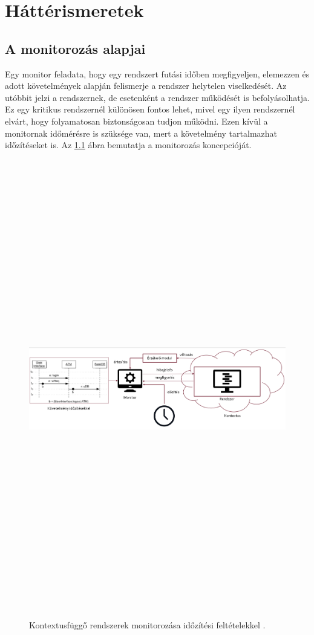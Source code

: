 \chapter{Háttérismeretek}\section{A monitorozás alapjai}

Egy monitor feladata, hogy egy rendszert futási időben megfigyeljen, elemezzen és adott követelmények alapján felismerje a rendszer helytelen viselkedését.
Az utóbbit jelzi a rendszernek, de esetenként a rendszer működését is befolyásolhatja.
Ez egy kritikus rendszernél különösen fontos lehet, mivel egy ilyen rendszernél elvárt, hogy folyamatosan biztonságosan tudjon működni.
Ezen kívül a monitornak időmérésre is szüksége van, mert a követelmény tartalmazhat időzítéseket is.
Az \ref{introductory_figure} ábra bemutatja a monitorozás koncepcióját.

\begin{figure}[!ht]
    \includegraphics[width=150mm, height=20cm, keepaspectratio]{figures/introductory_figure.png}
    \caption{Kontextusfüggő rendszerek monitorozása időzítési feltételekkel \cite{Bakai}.}
    \label{introductory_figure}
\end{figure}

